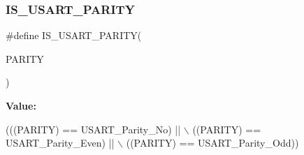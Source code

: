 \subsubsection{\texorpdfstring{I\+S\+\_\+\+U\+S\+A\+R\+T\+\_\+\+P\+A\+R\+I\+TY}{IS\_USART\_PARITY}}
{\footnotesize\ttfamily \#define I\+S\+\_\+\+U\+S\+A\+R\+T\+\_\+\+P\+A\+R\+I\+TY(\begin{DoxyParamCaption}\item[{}]{P\+A\+R\+I\+TY }\end{DoxyParamCaption})}

{\bfseries Value\+:}
\begin{DoxyCode}
(((PARITY) == USART\_Parity\_No) || \(\backslash\)
                                 ((PARITY) == USART\_Parity\_Even) || \(\backslash\)
                                 ((PARITY) == USART\_Parity\_Odd))
\end{DoxyCode}
